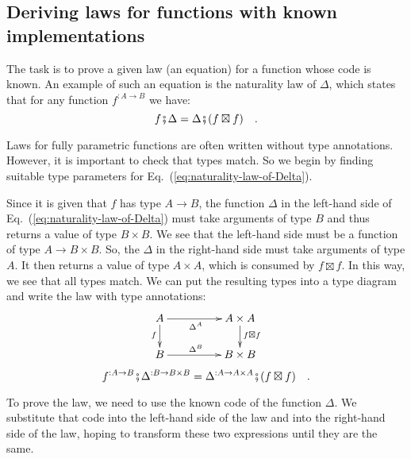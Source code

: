 \subsection{Deriving laws for functions with known implementations\label{subsec:Deriving-laws-for-functions-}}

The task is to prove a given law (an equation) for a function whose
code is known. An example of such an equation is the naturality
law of $\Delta$, which states that for any function $f^{:A\rightarrow B}$
we have:
\begin{equation}
f\bef\Delta=\Delta\bef(f\boxtimes f)\quad.\label{eq:naturality-law-of-Delta}
\end{equation}

Laws for fully parametric functions are often written without type
annotations. However, it is important to check that types match. So
we begin by finding suitable type parameters for Eq.~(\ref{eq:naturality-law-of-Delta}).

Since it is given that $f$ has type $A\rightarrow B$, the function
$\Delta$ in the left-hand side of Eq.~(\ref{eq:naturality-law-of-Delta})
must take arguments of type $B$ and thus returns a value of type
$B\times B$. We see that the left-hand side must be a function of
type $A\rightarrow B\times B$. So, the $\Delta$ in the right-hand
side must take arguments of type $A$. It then returns a value of
type $A\times A$, which is consumed by $f\boxtimes f$. In this way,
we see that all types match. We can put the resulting types into a
type diagram and write the law with type annotations:
\[
\xymatrix{\xyScaleY{1.6pc}\xyScaleX{4.0pc}A\ar[d]\sb(0.45){f}\ar[r]\sb(0.45){\Delta^{A}} & A\times A\ar[d]\sp(0.45){f\boxtimes f}\\
B\ar[r]\sp(0.45){\Delta^{B}} & B\times B
}
\]
\[
f^{:A\rightarrow B}\bef\Delta^{:B\rightarrow B\times B}=\Delta^{:A\rightarrow A\times A}\bef(f\boxtimes f)\quad.
\]

\noindent To prove the law, we need to use the known code of the function
$\Delta$. We substitute that code into the left-hand side of the
law and into the right-hand side of the law, hoping to transform these
two expressions until they are the same.

